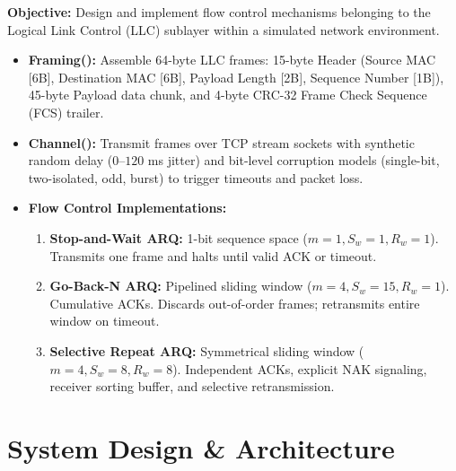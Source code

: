 \documentclass[11pt,a4paper]{article}
\begin{document}
\begin{problembox}
\textbf{Objective:} Design and implement flow control mechanisms belonging to the Logical Link Control (LLC) sublayer within a simulated network environment.
\begin{itemize}[leftmargin=1.2em]
    \item \textbf{Framing():} Assemble 64-byte LLC frames: 15-byte Header (Source MAC [6B], Destination MAC [6B], Payload Length [2B], Sequence Number [1B]), 45-byte Payload data chunk, and 4-byte CRC-32 Frame Check Sequence (FCS) trailer.
    \item \textbf{Channel():} Transmit frames over TCP stream sockets with synthetic random delay ($0$--$120$ ms jitter) and bit-level corruption models (single-bit, two-isolated, odd, burst) to trigger timeouts and packet loss.
    \item \textbf{Flow Control Implementations:}
    \begin{enumerate}[label=\textbf{(\alph*)}, leftmargin=1.4em]
        \item \textbf{Stop-and-Wait ARQ:} 1-bit sequence space ($m=1, S_w=1, R_w=1$). Transmits one frame and halts until valid ACK or timeout.
        \item \textbf{Go-Back-N ARQ:} Pipelined sliding window ($m=4, S_w=15, R_w=1$). Cumulative ACKs. Discards out-of-order frames; retransmits entire window on timeout.
        \item \textbf{Selective Repeat ARQ:} Symmetrical sliding window ($m=4, S_w=8, R_w=8$). Independent ACKs, explicit NAK signaling, receiver sorting buffer, and selective retransmission.
    \end{enumerate}
\end{itemize}
\end{problembox}

\clearpage
{}

\section{System Design \& Architecture}
\end{document}
